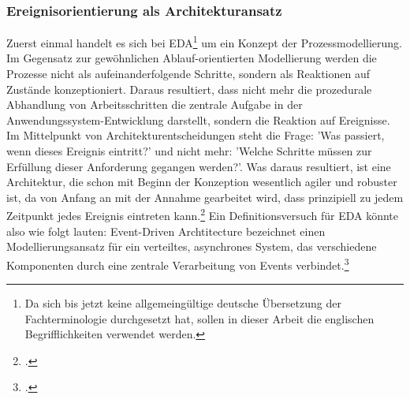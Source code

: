 \subsubsection*{Ereignisorientierung als Architekturansatz}
Zuerst einmal handelt es sich bei \ac{EDA}\footnote{Da sich bis jetzt keine allgemeingültige deutsche Übersetzung der Fachterminologie durchgesetzt hat, sollen in dieser Arbeit die englischen Begrifflichkeiten verwendet werden.} um ein Konzept der Prozessmodellierung. Im Gegensatz zur gewöhnlichen Ablauf-orientierten Modellierung werden die Prozesse nicht als aufeinanderfolgende Schritte, sondern als Reaktionen auf Zustände konzeptioniert. Daraus resultiert, dass nicht mehr die prozedurale Abhandlung von Arbeitsschritten die zentrale Aufgabe in der Anwendungssystem-Entwicklung darstellt, sondern die Reaktion auf Ereignisse. Im Mittelpunkt von Architekturentscheidungen steht die Frage: 'Was passiert, wenn dieses Ereignis eintritt?' und nicht mehr: 'Welche Schritte müssen zur Erfüllung dieser Anforderung gegangen werden?'. Was daraus resultiert, ist eine Architektur, die schon mit Beginn der Konzeption wesentlich agiler und robuster ist, da von Anfang an mit der Annahme gearbeitet wird, dass prinzipiell zu jedem Zeitpunkt jedes Ereignis eintreten kann.\footcite[Vgl.][S.30]{EDA2010}
Ein Definitionsversuch für \ac{EDA} könnte also wie folgt lauten: Event-Driven Archtitecture bezeichnet einen Modellierungsansatz für ein verteiltes, asynchrones System, das verschiedene Komponenten durch eine zentrale Verarbeitung von Events verbindet.\footcite[Vgl.][S. 248]{CLOUD2021}
